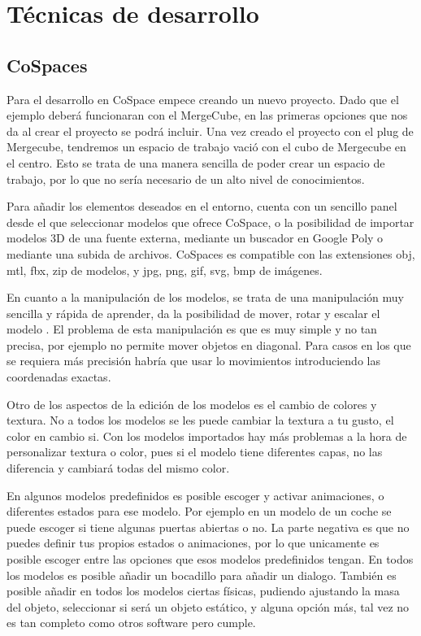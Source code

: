 

\section{Técnicas de desarrollo}
\subsection{CoSpaces}
Para el desarrollo en CoSpace empece creando un nuevo proyecto. Dado que el ejemplo deberá funcionaran con el MergeCube, en las primeras opciones que nos da al crear el proyecto se podrá incluir.
Una vez creado el proyecto con el plug de Mergecube, tendremos un espacio de trabajo vació con el cubo de Mergecube en el centro. Esto se trata de una manera sencilla de poder crear un espacio de trabajo, por lo que no sería necesario de un alto nivel de conocimientos.

Para añadir los elementos deseados en el entorno, cuenta con un sencillo panel desde el que seleccionar modelos que ofrece CoSpace, o la posibilidad de importar modelos 3D de una fuente externa, mediante un buscador en Google Poly o mediante una subida de archivos. CoSpaces es compatible con las extensiones obj, mtl, fbx, zip de modelos, y jpg, png, gif, svg, bmp de imágenes.

En cuanto a la manipulación de los modelos, se trata de una manipulación muy sencilla y rápida de aprender, da la posibilidad de mover, rotar y escalar el modelo . El problema de esta manipulación es que es muy simple y no tan precisa, por ejemplo no permite mover objetos en diagonal. Para casos en los que se requiera más precisión habría que usar lo movimientos introduciendo las coordenadas exactas.

Otro de los aspectos de la edición de los modelos es el cambio de colores y textura. No a todos los modelos se les puede cambiar la textura a tu gusto, el color en cambio si. Con los modelos importados hay más problemas a la hora de personalizar textura o color, pues si el modelo tiene diferentes capas, no las diferencia y cambiará todas del mismo color. 

En algunos modelos predefinidos es posible escoger y activar animaciones, o diferentes estados para ese modelo. Por ejemplo en un modelo de un coche se puede escoger si tiene algunas puertas abiertas o no. La parte negativa es que no puedes definir tus propios estados o animaciones, por lo que unicamente es posible escoger entre las opciones que esos modelos predefinidos tengan. En todos los modelos es posible añadir un bocadillo para añadir un dialogo. También es posible añadir en todos los modelos ciertas físicas, pudiendo ajustando la masa del objeto, seleccionar si será un objeto estático, y alguna opción más, tal vez no es tan completo como otros software pero cumple.


